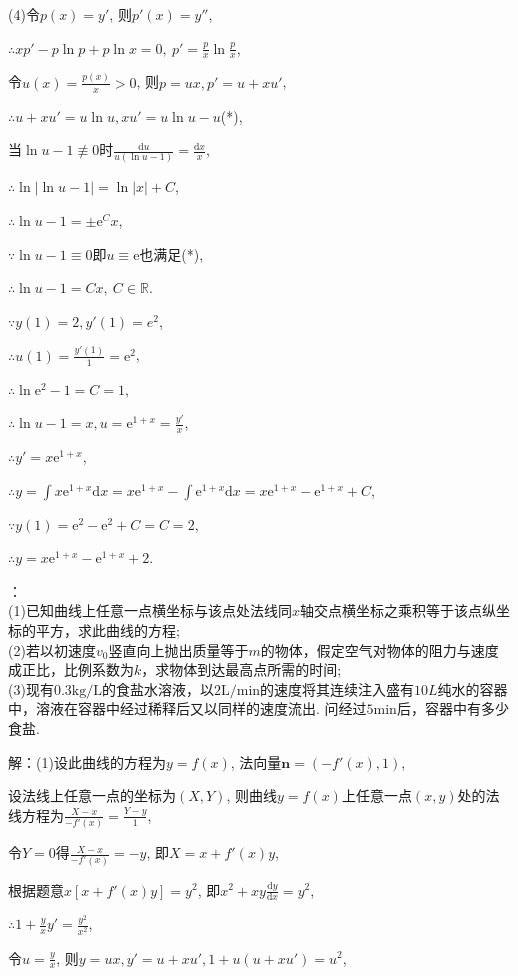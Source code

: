 \documentclass[12pt,UTF8]{ctexart}
\newcommand{\md}[1]{\mathrm d#1}
\newcommand{\me}[0]{\mathrm e}
\begin{document}
\begin{enumerate}
(4)令$p(x)=y'$, 则$p'(x)=y''$,

$\therefore xp'-p\ln p+p\ln x=0,\ p'=\frac px\ln\frac px$,

令$u(x)=\frac{p(x)}x>0$, 则$p=ux,p'=u+xu'$,

$\therefore u+xu'=u\ln u, xu'=u\ln u-u$(*),

当$\ln u-1\not\equiv0$时$\frac{\md u}{u(\ln u-1)}=\frac{\md x}x$,

$\therefore\ln|\ln u-1|=\ln|x|+C$,

$\therefore\ln u-1=\pm\me^Cx$,

$\because\ln u-1\equiv0$即$u\equiv\me$也满足(*),

$\therefore\ln u-1=Cx,\ C\in\mathbb R$.

$\because y(1)=2,y'(1)=e^2$,

$\therefore u(1)=\frac{y'(1)}{1}=\me^2$,

$\therefore\ln\me^2-1=C=1$,

$\therefore\ln u-1=x, u=\me^{1+x}=\frac{y'}x$,

$\therefore y'=x\me^{1+x}$,

$\therefore y=\int x\me^{1+x}\md x=x\me^{1+x}-\int\me^{1+x}\md x=x\me^{1+x}-\me^{1+x}+C$,

$\because y(1)=\me^2-\me^2+C=C=2$,

$\therefore y=x\me^{1+x}-\me^{1+x}+2$.

：\\
(1)已知曲线上任意一点横坐标与该点处法线同$x$轴交点横坐标之乘积等于该点纵坐标的平方，求此曲线的方程;\\
(2)若以初速度$v_0$竖直向上抛出质量等于$m$的物体，假定空气对物体的阻力与速度成正比，比例系数为$k$，求物体到达最高点所需的时间;\\
(3)现有$0.3\text{kg/L}$的食盐水溶液，以$2\text{L/min}$的速度将其连续注入盛有$10L$纯水的容器中，溶液在容器中经过稀释后又以同样的速度流出. 问经过$5\text{min}$后，容器中有多少食盐.

解：(1)设此曲线的方程为$y=f(x)$, 法向量$\bm n=(-f'(x),1)$,

设法线上任意一点的坐标为$(X,Y)$, 则曲线$y=f(x)$上任意一点$(x,y)$处的法线方程为$\frac{X-x}{-f'(x)}=\frac{Y-y}1$,

令$Y=0$得$\frac{X-x}{-f'(x)}=-y$, 即$X=x+f'(x)y$,

根据题意$x[x+f'(x)y]=y^2$, 即$x^2+xy\frac{\md y}{\md x}=y^2$,

$\therefore1+\frac yxy'=\frac{y^2}{x^2}$,

令$u=\frac yx$, 则$y=ux,y'=u+xu', 1+u(u+xu')=u^2$,


\end{enumerate}
\end{document}
